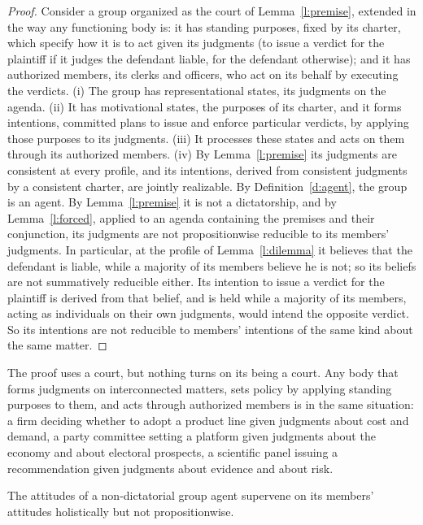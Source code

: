 \documentclass{situationist-preprint}
\begin{document}
\begin{proof}
Consider a group organized as the court of Lemma~\ref{l:premise}, extended in the way any functioning body is: it has standing purposes, fixed by its charter, which specify how it is to act given its judgments (to issue a verdict for the plaintiff if it judges the defendant liable, for the defendant otherwise); and it has authorized members, its clerks and officers, who act on its behalf by executing the verdicts. (i) The group has representational states, its judgments on the agenda. (ii) It has motivational states, the purposes of its charter, and it forms intentions, committed plans to issue and enforce particular verdicts, by applying those purposes to its judgments. (iii) It processes these states and acts on them through its authorized members. (iv) By Lemma~\ref{l:premise} its judgments are consistent at every profile, and its intentions, derived from consistent judgments by a consistent charter, are jointly realizable. By Definition~\ref{d:agent}, the group is an agent. By Lemma~\ref{l:premise} it is not a dictatorship, and by Lemma~\ref{l:forced}, applied to an agenda containing the premises and their conjunction, its judgments are not propositionwise reducible to its members' judgments. In particular, at the profile of Lemma~\ref{l:dilemma} it believes that the defendant is liable, while a majority of its members believe he is not; so its beliefs are not summatively reducible either. Its intention to issue a verdict for the plaintiff is derived from that belief, and is held while a majority of its members, acting as individuals on their own judgments, would intend the opposite verdict. So its intentions are not reducible to members' intentions of the same kind about the same matter.
\end{proof}

The proof uses a court, but nothing turns on its being a court. Any body that forms judgments on interconnected matters, sets policy by applying standing purposes to them, and acts through authorized members is in the same situation: a firm deciding whether to adopt a product line given judgments about cost and demand, a party committee setting a platform given judgments about the economy and about electoral prospects, a scientific panel issuing a recommendation given judgments about evidence and about risk.

\begin{corollary}\label{c:holism}
The attitudes of a non-dictatorial group agent supervene on its members' attitudes holistically but not propositionwise.
\end{corollary}
\end{document}
